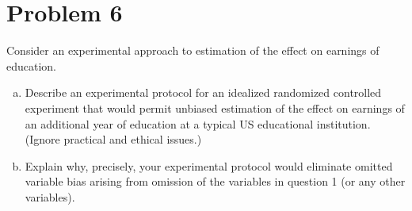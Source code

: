 \documentclass[a4paper]{article}
\begin{document}
\section*{Problem 6}
Consider an experimental approach to estimation of the effect on earnings of education.
\begin{enumerate}[(a)]
\item Describe an experimental protocol for an idealized randomized controlled experiment
that would permit unbiased estimation of the effect on earnings of an additional year of education at a typical US educational institution. (Ignore practical and ethical issues.)
\item Explain why, precisely, your experimental protocol would eliminate omitted variable
bias arising from omission of the variables in question 1 (or any other variables).
\end{enumerate}
\end{document}
